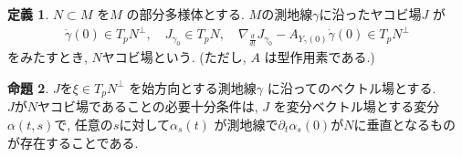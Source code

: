 \documentclass[10pt, fleqn, label-section=none]{bxjsarticle}
\theoremstyle{definition}
\newtheorem{dfn}{定義}[section]
\newtheorem{prop}[dfn]{命題}
\renewcommand{\-}{\hyphen}
\begin{document}
\begin{dfn}
$N\subset M$ を$M$ の部分多様体とする. $M$の測地線$\gamma $に沿ったヤコビ場$J$ が
\begin{align*} \dot \gamma(0) \in T_p N ^\perp , \quad J_{\gamma_0} \in T_pN, \quad \nabla_{\frac{d}{dt}} J_{\gamma_0} - A_{Y_\gamma(0)} \dot \gamma(0) \in T_p N^\perp  \end{align*}
をみたすとき, $N$ヤコビ場という. (ただし, $A$ は型作用素である.)
\end{dfn}

\begin{prop}
$J$を$\xi \in T_p N ^\perp$ を始方向とする測地線$\gamma$ に沿ってのベクトル場とする. \\
$J$が$N$ヤコビ場であることの必要十分条件は, $J$ を変分ベクトル場とする変分$\alpha(t,s)$で, 任意の$s$に対して$\alpha_s (t)$ が測地線で$\partial_t \alpha_s (0)$が$N$に垂直となるものが存在することである. 
\end{prop}
\end{document}
